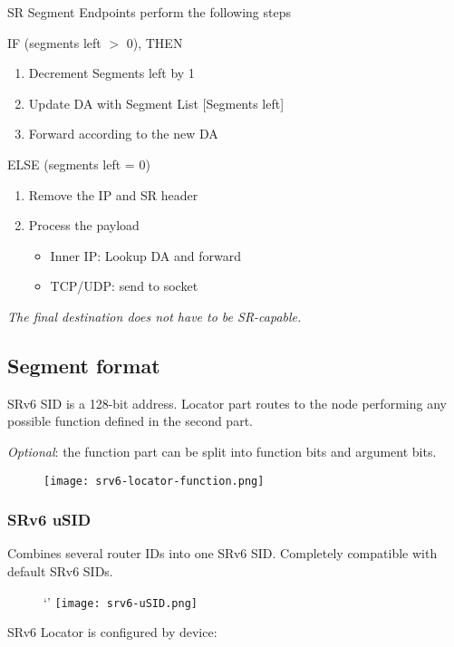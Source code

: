 \vspace{5mm}
\noindent
SR Segment Endpoints perform the following steps

\noindent
IF (segments left $>$ 0), THEN 
\begin{enumerate}
    \item Decrement Segments left by 1
    \item Update DA with Segment List [Segments left]
    \item Forward according to the new DA
\end{enumerate}

\noindent
ELSE (segments left = 0)
\begin{enumerate}
    \item Remove the IP and SR header
    \item Process the payload
    \begin{itemize}
        \item Inner IP: Lookup DA and forward
        \item TCP/UDP: send to socket
    \end{itemize}
\end{enumerate}

\emph{The final destination does not have to be SR-capable.}

\subsection{Segment format}
SRv6 SID is a 128-bit address.
Locator part routes to the node performing any possible function defined in the second part.

\emph{Optional}: the function part can be split into function bits and argument bits.
\begin{figure}[h]
    \centering
    \texttt{[image: srv6-locator-function.png]}
\end{figure}

\subsubsection{SRv6 uSID}
Combines several router IDs into one SRv6 SID. Completely compatible with default SRv6 SIDs.

\begin{figure}`'
    \centering
    \texttt{[image: srv6-uSID.png]}
\end{figure}

\vspace{5mm}
\noindent
SRv6 Locator is configured by device:

